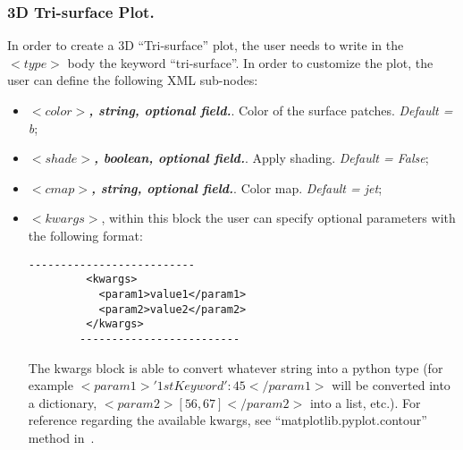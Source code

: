 \subsubsection{3D Tri-surface Plot.}
In order to create a 3D ``Tri-surface'' plot, the user needs to write in the $<type>$ body the keyword ``tri-surface''. In order to customize the plot, the user can define the following XML sub-nodes:
  \begin{itemize}
     \item $<color>$\textbf{\textit{, string, optional  field.}}. Color of the surface patches. \textit{Default = b}; 
     \item $<shade>$\textbf{\textit{, boolean, optional  field.}}. Apply shading. \textit{Default = False};
     \item $<cmap>$\textbf{\textit{, string, optional  field.}}. Color map. \textit{Default = jet};
 \item \textit{$<kwargs>$},  within this block the user can specify optional parameters with the following format:
        \begin{lstlisting}[style=XML]
        --------------------------
         <kwargs>
           <param1>value1</param1>
           <param2>value2</param2>
         </kwargs>
        -------------------------
       \end{lstlisting}
         The kwargs block is able to convert whatever string into a python type (for example $<param1>{'1stKeyword':45}</param1>$ will be converted into a dictionary, $<param2>[56,67]</param2>$ into a list, etc.). For reference regarding the available kwargs, see ``matplotlib.pyplot.contour'' method in~\cite{MatPlotLib}.
    \end{itemize}
  
